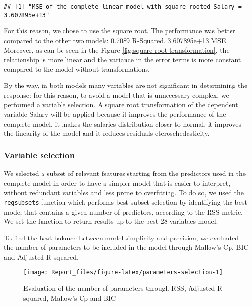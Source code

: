 \documentclass[
]{article}
\begin{document}
\begin{verbatim}
## [1] "MSE of the complete linear model with square rooted Salary =  3.607895e+13"
\end{verbatim}

For this reason, we chose to use the square root. The performance was
better compared to the other two models: 0.7089 R-Squared, 3.607895e+13
MSE. Moreover, as can be seen in the Figure
\ref{fig:square-root-transformation}, the relationship is more linear
and the variance in the error terms is more constant compared to the
model without transformations.

By the way, in both models many variables are not significant in
determining the response: for this reason, to avoid a model that is
unnecessary complex, we performed a variable selection. A square root
transformation of the dependent variable Salary will be applied because
it improves the performance of the complete model, it makes the salaries
distribution closer to normal, it improves the linearity of the model
and it reduces residuals eteroschedasticity.

\hypertarget{variable-selection}{%
\subsubsection{Variable selection}\label{variable-selection}}

We selected a subset of relevant features starting from the predictors
used in the complete model in order to have a simpler model that is
easier to interpret, without redundant variables and less prone to
overfitting. To do so, we used the \texttt{regsubsets} function which
performs best subset selection by identifying the best model that
contains a given number of predictors, according to the RSS metric. We
set the function to return results up to the best 28-variables model.

To find the best balance between model simplicity and precision, we
evaluated the number of parameters to be included in the model through
Mallow's Cp, BIC and Adjusted R-squared.

\begin{figure}

{\centering \texttt{[image: Report\_files/figure-latex/parameters-selection-1]} 

}

\caption{Evaluation of the number of parameters through RSS, Adjusted R-squared, Mallow's Cp and BIC \label{fig:parameters-selection}}\label{fig:parameters-selection}
\end{figure}
\end{document}
